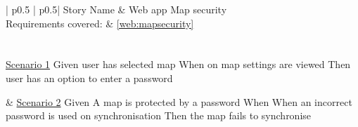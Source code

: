 \begin{longtable}{| p{} | p{}|}
	\hline
	\newline Story Name & \newline Web app Map security\\\hline
	\newline Requirements covered: & \newline \ref{web:mapsecurity}\\\hline
	\\\hline
	\\\hline
	\newline\underline{Scenario 1}\newline
	Given user has selected map \newline
	When on map settings are viewed \newline 
	Then user has an option to enter a password\newline
	
	&
	\newline\underline{Scenario 2}\newline
	Given A map is protected by a password \newline
	When When an incorrect password is used on synchronisation \newline 
	Then the map fails to synchronise\newline
	\\\hline
\end{longtable}